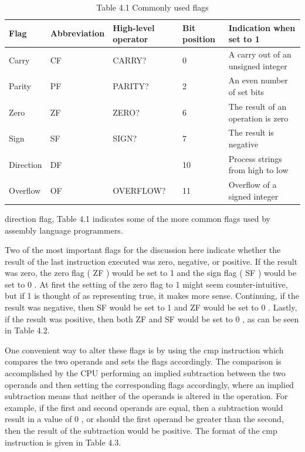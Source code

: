 \documentclass[10pt]{book}
\begin{document}
\begin{table}[htbp]
\begin{center}
\captionsetup{labelformat=empty}
\caption{Table 4.1 Commonly used flags}
\begin{tabular}{|l|l|l|l|l|}
\hline
Flag & Abbreviation & High-level operator & Bit position & Indication when set to 1 \\

\hline
Carry & CF & CARRY? & 0 & A carry out of an unsigned integer \\
\hline
Parity & PF & PARITY? & 2 & An even number of set bits \\
\hline
Zero & ZF & ZERO? & 6 & The result of an operation is zero \\
\hline
Sign & SF & SIGN? & 7 & The result is negative \\
\hline
Direction & DF &  & 10 & Process strings from high to low \\
\hline
Overflow & OF & OVERFLOW? & 11 & Overflow of a signed integer \\
\hline
\end{tabular}
\end{center}
\end{table}

direction flag, Table 4.1 indicates some of the more common flags used by assembly language programmers.

Two of the most important flags for the discussion here indicate whether the result of the last instruction executed was zero, negative, or positive. If the result was zero, the zero flag ( ZF ) would be set to 1 and the sign flag ( SF ) would be set to 0 . At first the setting of the zero flag to 1 might seem counter-intuitive, but if 1 is thought of as representing true, it makes more sense. Continuing, if the result was negative, then SF would be set to 1 and ZF would be set to 0 . Lastly, if the result was positive, then both ZF and SF would be set to 0 , as can be seen in Table 4.2.

One convenient way to alter these flags is by using the cmp instruction which compares the two operands and sets the flags accordingly. The comparison is accomplished by the CPU performing an implied subtraction between the two operands and then setting the corresponding flags accordingly, where an implied subtraction means that neither of the operands is altered in the operation. For example, if the first and second operands are equal, then a subtraction would result in a value of 0 , or should the first operand be greater than the second, then the result of the subtraction would be positive. The format of the cmp instruction is given in Table 4.3.
\end{document}
